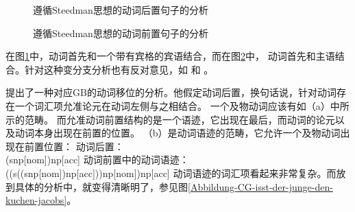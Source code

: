 \begin{figure}
\centerline{%
}
\caption{\label{Abbildung-CG-der-Mann-der-Frau-das-Buch-gibt}遵循Steedman思想的动词后置句子的分析}
\end{figure}%
\begin{figure}
\centerline{%
}
\caption{\label{Abbildung-CG-gibt-der-Mann-der-Frau-das-Buch}遵循Steedman思想的动词前置句子的分析}
\end{figure}%
在图\ref{Abbildung-CG-der-Mann-der-Frau-das-Buch-gibt}中，动词首先和一个带有宾格的宾语结合，而在图\ref{Abbildung-CG-gibt-der-Mann-der-Frau-das-Buch}中，
动词首先和主语结合。针对这种变分支分析也有反对意见，如 和 。

 \citet{Jacobs91a}提出了一种对应GB\indexgbc 的动词移位的分析。他假定动词后置，换句话说，针对动词存在一个词汇项允准论元在动词左侧与之相结合。
一个及物动词应该有如（a）中所示的范畴。
而允准动词前置结构的是一个语迹，它出现在最后，而动词的论元以及动词本身出现在前置的位置。
（b）是动词语迹的范畴，它允许一个及物动词出现在前置位置：
\eal
\ex 动词后置：\\
    (s\bs np[nom])\bs np[acc]
\ex 动词前置中的动词语迹：\\
    ((s\bs ((s\bs np[nom])\bs np[acc]))\bs np[nom])\bs np[acc]
\zl
动词语迹的词汇项看起来非常复杂。而放到具体的分析中，就变得清晰明了，参见图\vref{Abbildung-CG-isst-der-junge-den-kuchen-jacobs}。

